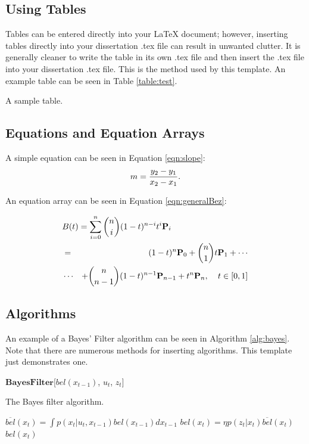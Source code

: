 \documentclass[10pt]{report}  %
\begin{document}
\subsection{Using Tables}
Tables can be entered directly into your LaTeX document; however, inserting tables directly into your dissertation .tex file can result in unwanted clutter. It is generally cleaner to write the table in its own .tex file and then insert the .tex file into your dissertation .tex file. This is the method used by this template. An example table can be seen in Table \ref{table:test}.

\begin{table}
\scriptsize
\renewcommand{\tabcolsep}{0.09cm}
\centering

\caption{A sample table.}
\label{table:test}
\end{table}

\subsection{Equations and Equation Arrays}
A simple equation can be seen in Equation \ref{eqn:slope}:
\begin{equation}
\centering
m = \frac{y_{2} - y_{1}}{x_{2} - x_{1}}.
\label{eqn:slope}
\end{equation}

An equation array can be seen in Equation \ref{eqn:generalBez}: 

\begin{eqnarray}
\lefteqn{B(t) =  \sum_{i=0}^n \binom{n}{i} (1-t)^{n-i}t^{i}\mathbf{P}_i }\nonumber \\ 
& = & (1-t)^{n}\mathbf{P}_0 + \binom{n}{1}t\mathbf{P}_1+ \cdots  \nonumber \\
 &\cdots & + \binom{n}{n-1}(1-t)^{n-1}\mathbf{P}_{n-1} + t^{n}\mathbf{P}_n, \phantom{ttt} t \in [0,1]
\label{eqn:generalBez}
\end{eqnarray}

\subsection{Algorithms}
An example of a Bayes' Filter \citep*{Thrun2005} algorithm can be seen in Algorithm \ref{alg:bayes}. Note that there are numerous methods for inserting algorithms. This template just demonstrates one.

\begin{algorithm}{$\mathbf{Bayes Filter}$}[$bel(x_{t-1})$, $u_t$, $z_t$]
\caption{The Bayes filter algorithm.}
\label{alg:bayes}
\begin{algorithmic}[1]
\STATE $\overline{bel}(x_t) = \int p(x_t | u_t, x_{t-1}) bel(x_{t-1})dx_{t-1}$
\STATE $bel(x_t) = \eta p(z_t | x_t) \overline{bel}(x_t)$
\ENDFOR
\RETURN $bel(x_t)$
\end{algorithmic}
\end{algorithm}
\end{document}
